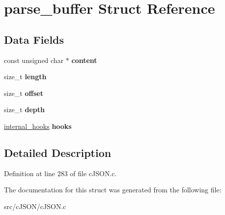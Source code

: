 \hypertarget{structparse__buffer}{}\section{parse\+\_\+buffer Struct Reference}
\label{structparse__buffer}
\subsection*{Data Fields}
\begin{DoxyCompactItemize}
\item 
\mbox{\label{structparse__buffer_a52ee1184576baa3d5171059ab0e942de}} 
const unsigned char $\ast$ {\bfseries content}
\item 
\mbox{\label{structparse__buffer_a036970e9335896d3cee8459eda9e2eb9}} 
size\+\_\+t {\bfseries length}
\item 
\mbox{\label{structparse__buffer_af727920073077579942a79de519bb31a}} 
size\+\_\+t {\bfseries offset}
\item 
\mbox{\label{structparse__buffer_af613c4ed7d73f76c60c50d1bcf4c67a0}} 
size\+\_\+t {\bfseries depth}
\item 
\mbox{\label{structparse__buffer_a2c3e99b15da2935fc5d58124ffb4a894}} 
\hyperlink{structinternal__hooks}{internal\+\_\+hooks} {\bfseries hooks}
\end{DoxyCompactItemize}


\subsection{Detailed Description}


Definition at line 283 of file c\+J\+S\+O\+N.\+c.



The documentation for this struct was generated from the following file\+:\begin{DoxyCompactItemize}
\item 
src/c\+J\+S\+O\+N/c\+J\+S\+O\+N.\+c\end{DoxyCompactItemize}
